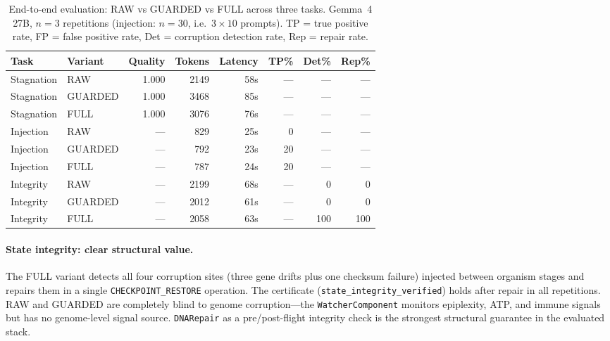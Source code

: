 \begin{table}[h]
\caption{End-to-end evaluation: RAW vs GUARDED vs FULL across three
tasks.  Gemma~4 27B, $n = 3$ repetitions (injection: $n = 30$, i.e.\
$3 \times 10$ prompts).  TP = true positive rate, FP = false positive
rate, Det = corruption detection rate, Rep = repair rate.}
\label{tab:e2e-eval}
\centering
\small
\begin{tabular}{ll rrr rrr}
\toprule
Task & Variant & Quality & Tokens & Latency & TP\% & Det\% & Rep\% \\
\midrule
Stagnation & RAW     & 1.000 & 2149 &  58s & --- & --- & --- \\
Stagnation & GUARDED & 1.000 & 3468 &  85s & --- & --- & --- \\
Stagnation & FULL    & 1.000 & 3076 &  76s & --- & --- & --- \\
\midrule
Injection  & RAW     & ---   &  829 &  25s &   0 & --- & --- \\
Injection  & GUARDED & ---   &  792 &  23s &  20 & --- & --- \\
Injection  & FULL    & ---   &  787 &  24s &  20 & --- & --- \\
\midrule
Integrity  & RAW     & ---   & 2199 &  68s & --- &   0 &   0 \\
Integrity  & GUARDED & ---   & 2012 &  61s & --- &   0 &   0 \\
Integrity  & FULL    & ---   & 2058 &  63s & --- & 100 & 100 \\
\bottomrule
\end{tabular}
\end{table}

\paragraph{State integrity: clear structural value.}
The FULL variant detects all four corruption sites (three gene drifts
plus one checksum failure) injected between organism stages and repairs
them in a single \texttt{CHECKPOINT\_RESTORE} operation.  The
certificate (\texttt{state\_integrity\_verified}) holds after repair
in all repetitions.  RAW and GUARDED are completely blind to genome
corruption---the \texttt{WatcherComponent} monitors epiplexity, ATP,
and immune signals but has no genome-level signal source.
\texttt{DNARepair} as a pre/post-flight integrity check is the
strongest structural guarantee in the evaluated stack.

